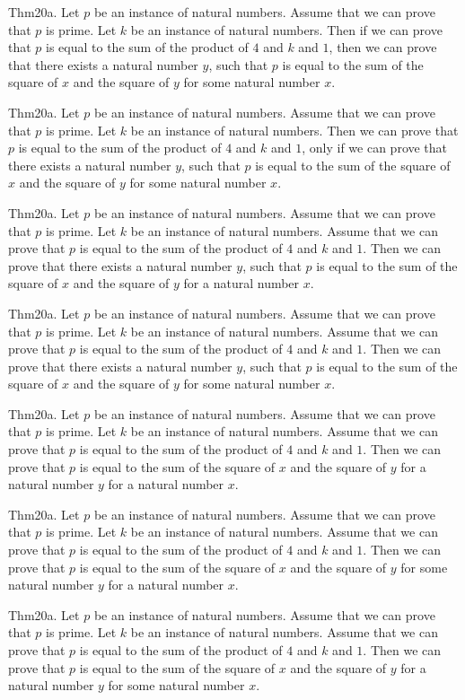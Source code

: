 \documentclass{article}
\begin{document}
Thm20a. Let $p$ be an instance of natural numbers. Assume that we can prove that $p$ is prime. Let $k$ be an instance of natural numbers. Then if we can prove that $p$ is equal to the sum of the product of $4$ and $k$ and $1$, then we can prove that there exists a natural number $y$, such that $p$ is equal to the sum of the square of $x$ and the square of $y$ for some natural number $x$.

Thm20a. Let $p$ be an instance of natural numbers. Assume that we can prove that $p$ is prime. Let $k$ be an instance of natural numbers. Then we can prove that $p$ is equal to the sum of the product of $4$ and $k$ and $1$, only if we can prove that there exists a natural number $y$, such that $p$ is equal to the sum of the square of $x$ and the square of $y$ for some natural number $x$.

Thm20a. Let $p$ be an instance of natural numbers. Assume that we can prove that $p$ is prime. Let $k$ be an instance of natural numbers. Assume that we can prove that $p$ is equal to the sum of the product of $4$ and $k$ and $1$. Then we can prove that there exists a natural number $y$, such that $p$ is equal to the sum of the square of $x$ and the square of $y$ for a natural number $x$.

Thm20a. Let $p$ be an instance of natural numbers. Assume that we can prove that $p$ is prime. Let $k$ be an instance of natural numbers. Assume that we can prove that $p$ is equal to the sum of the product of $4$ and $k$ and $1$. Then we can prove that there exists a natural number $y$, such that $p$ is equal to the sum of the square of $x$ and the square of $y$ for some natural number $x$.

Thm20a. Let $p$ be an instance of natural numbers. Assume that we can prove that $p$ is prime. Let $k$ be an instance of natural numbers. Assume that we can prove that $p$ is equal to the sum of the product of $4$ and $k$ and $1$. Then we can prove that $p$ is equal to the sum of the square of $x$ and the square of $y$ for a natural number $y$ for a natural number $x$.

Thm20a. Let $p$ be an instance of natural numbers. Assume that we can prove that $p$ is prime. Let $k$ be an instance of natural numbers. Assume that we can prove that $p$ is equal to the sum of the product of $4$ and $k$ and $1$. Then we can prove that $p$ is equal to the sum of the square of $x$ and the square of $y$ for some natural number $y$ for a natural number $x$.

Thm20a. Let $p$ be an instance of natural numbers. Assume that we can prove that $p$ is prime. Let $k$ be an instance of natural numbers. Assume that we can prove that $p$ is equal to the sum of the product of $4$ and $k$ and $1$. Then we can prove that $p$ is equal to the sum of the square of $x$ and the square of $y$ for a natural number $y$ for some natural number $x$.
\end{document}
